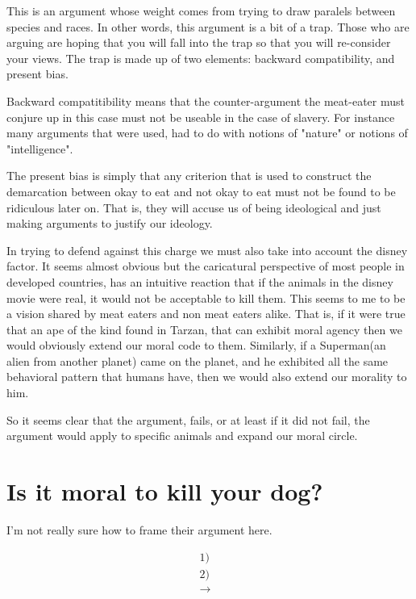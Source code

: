 \documentclass[12pt]{report}
\numberwithin{equation}{section}
\begin{document}
This is an argument whose weight comes from trying to draw paralels between species and races. In other words, this argument is a bit of a trap. Those who are arguing are hoping that you will fall into the trap so that you will re-consider your views. The trap is made up of two elements: backward compatibility, and present bias. 

Backward compatitibility means that the counter-argument the meat-eater must conjure up in this case must not be useable in the case of slavery. For instance many arguments that were used, had to do with notions of "nature" or notions of "intelligence".

The present bias is simply that any criterion that is used to construct the demarcation between okay to eat and not okay to eat must not be found to be ridiculous later on. That is, they will accuse us of being ideological and just making arguments to justify our ideology. 

In trying to defend against this charge we must also take into account the disney factor. It seems almost obvious but the caricatural perspective of most people in developed countries, has an intuitive reaction that if the animals in the disney movie were real, it would not be acceptable to kill them. This seems to me to be a vision shared by meat eaters and non meat eaters alike. That is, if it were true that an ape of the kind found in Tarzan, that can exhibit moral agency then we would obviously extend our moral code to them. Similarly, if a Superman(an alien from another planet) came on the planet, and he exhibited all the same behavioral pattern that humans have, then we would also extend our morality to him. 

So it seems clear that the argument, fails, or at least if it did not fail, the argument would apply to specific animals and expand our moral circle. 

\section{Is it moral to kill your dog?}

I'm not really sure how to frame their argument here. 

\begin{mdframed}[style=MyFrame]
\begin{align*}
1)& \text{} \\
2)& \text{} \\
\rightarrow& \text{}
\end{align*}
\end{mdframed}
\end{document}
